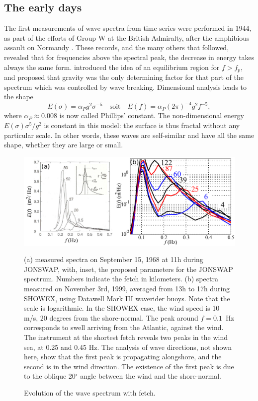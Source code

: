 \subsection{The early days}
The first measurements of wave spectra from time series were performed in 1944, as part of the efforts of Group W at the British Admiralty, 
after the amphibious assault on Normandy  \citep[][]{Barber&al.1946,Ursell1999}. These records, and the many others that followed, 
revealed that for frequencies above the spectral peak, the decrease in energy takes always the same form. \cite{Phillips1958}
 introduced the idea of an  equilibrium region for
$f>f_p$, and proposed that gravity was the only determining factor for that part of the spectrum which was controlled by wave breaking.  
Dimensional analysis leads to the shape 
\begin{equation}
   E(\sigma)=\alpha_P g^2 \sigma^{-5} \quad \mathrm{soit} \quad E(f)=\alpha_P \left(2\pi\right)^{-4} g^2 f^{-5},
\end{equation}
where $\alpha_P\approx 0.008$ is now called Phillips' constant. The non-dimensional energy $E(\sigma) \sigma^{5}/g^2$ is constant
in this model: the surface is thus fractal without any particular scale. In other words, these waves are self-similar and have all the same 
shape, whether they are large or small. 
\begin{figure}[!hbt]
\centerline{\includegraphics[width=\textwidth]{FIGS_CH_FETCH/overshoot_JONSWAP_SHOWEX.pdf}}
  \caption{Evolution of the wave spectrum with fetch.}{(a) measured spectra on September 15, 1968 at 11h
  during JONSWAP, with, inset, the proposed parameters for the JONSWAP spectrum. Numbers indicate the fetch in kilometers. (b) spectra measured on November 3rd, 1999, averaged from 13h to 17h during SHOWEX, 
using Datawell Mark III waverider buoys. 
Note that the scale is logarithmic. In the SHOWEX case, the wind speed is 10 m/s, 20 degrees from the shore-normal. The peak around $f=0.1$~Hz
  corresponds to swell arriving from the Atlantic, against the wind. The instrument at the shortest fetch 
reveals two peaks in the wind sea, at 0.25 and 0.45 Hz. The analysis of wave directions, not shown here, show that the first peak is propagating 
alongshore, and the second is in the 
wind direction. The existence of the first peak is due to the oblique 20$^\circ$ angle between the wind and the shore-normal.}
\label{fig_overshoot}
\end{figure}
